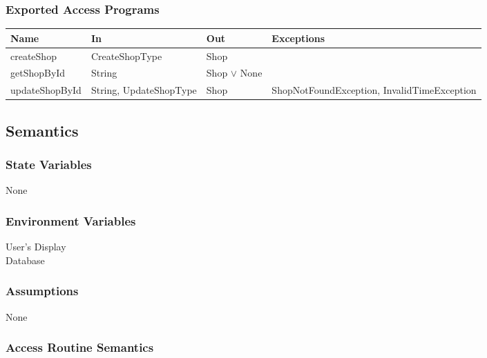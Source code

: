 \documentclass[12pt, titlepage]{article}
\begin{document}
\subsubsection{Exported Access Programs}

\begin{center}
	\begin{adjustbox}{width=\textwidth}
		\begin{tabular}{llll}
			\hline
			\textbf{Name}  & \textbf{In}            & \textbf{Out}     & \textbf{Exceptions}                         \\
			\hline
			createShop     & CreateShopType         & Shop             & ~                                           \\
			getShopById    & String                 & Shop $\lor$ None & ~                                           \\
			updateShopById & String, UpdateShopType & Shop             & ShopNotFoundException, InvalidTimeException \\
			\hline
		\end{tabular}
	\end{adjustbox}
\end{center}

\subsection{Semantics}

\subsubsection{State Variables}

None

\subsubsection{Environment Variables}

User's Display \\ Database

\subsubsection{Assumptions}

None

\subsubsection{Access Routine Semantics}
\end{document}
